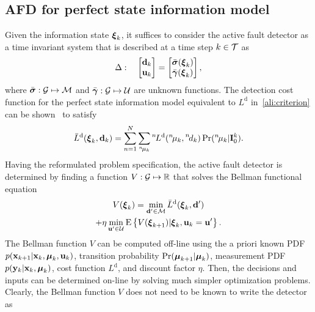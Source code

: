 \documentclass[conference,letterpaper]{IEEEtran}
\def\nth{\prescript{n\!}{}}
\begin{document}
\subsection{AFD for perfect state information model}\label{sec:afdPerfectStateInformationModel}
Given the information state $\boldsymbol{\xi}_{k}$, it suffices to consider the active fault detector as a time invariant system that is described at a time step $k\in\mathcal{T}$ as
\begin{align}
  \Delta:\quad
  \begin{bmatrix}
    \mathbf{d}_{k}\\ \mathbf{u}_{k}
  \end{bmatrix} =
  \begin{bmatrix}
    \bar{\boldsymbol{\sigma}}(\boldsymbol{\xi}_{k})\\ \bar{\boldsymbol{\gamma}}(\boldsymbol{\xi}_{k})
  \end{bmatrix},
\end{align}
where $\bar{\boldsymbol{\sigma}}:\mathcal{G}\mapsto\mathcal{M}$ and $\bar{\boldsymbol{\gamma}}:\mathcal{G}\mapsto\mathcal{U}$ are unknown functions. 
The detection cost function for the perfect state information model equivalent to $L^{\mathrm{d}}$ in~\eqref{ali:criterion} can be shown~\cite{Puncochar2014:ja:AMCS} to satisfy 
\begin{align}\label{ali:detection_cost_function}
  \bar{L}^{\mathrm{d}}(\bfxi_{k},\bfd_{k}) = 
    \sum_{n=1}^N\sum_{\nth{\mu}_{k}}
    \nth{L}^{\mathrm{d}}(\nth{\mu}_{k},\nth{d}_{k})\Pr(\nth{\mu}_{k} \vert \bfI_{0}^{k}).
\end{align}
Having the reformulated problem specification, the active fault detector is determined by finding a function $V:\mathcal{G}\mapsto\mathbb{R}$ that solves the Bellman functional equation~\cite{Bertsekas2012:b,Vrabie2013:b}
\begin{multline} \label{ali:BellmanFunctionalEquation}
   V(\boldsymbol{\xi}_{k}) = \min_{\mathbf{d}'\in\mathcal{M}} \bar{L}^{\mathrm{d}}(\boldsymbol{\xi}_{k},\mathbf{d}')\\
  +\eta\min_{\mathbf{u}'\in\mathcal{U}} \operatorname*{E} \left\{ V(\boldsymbol{\xi}_{k+1}) \vert
  \boldsymbol{\xi}_{k},\mathbf{u}_k=\mathbf{u}' \right\}.
\end{multline}
The Bellman function $V$ can be computed off-line using the a priori known PDF $p ( \mathbf{x}_{k+1} \vert \mathbf{x}_{k},\boldsymbol{\mu}_{k},\mathbf{u}_{k} )$, transition probability $\Pr(\boldsymbol{\mu}_{k+1} \vert \boldsymbol{\mu}_{k})$, measurement PDF $p(\mathbf{y}_k\vert \mathbf{x}_k,\boldsymbol{\mu}_k)$, cost function $L^{\mathrm{d}}$, and discount factor $\eta$. 
Then, the decisions and  inputs can be determined on-line by solving much simpler optimization problems. 
Clearly, the Bellman function $V$ does not need to be known to write the detector as
\end{document}
